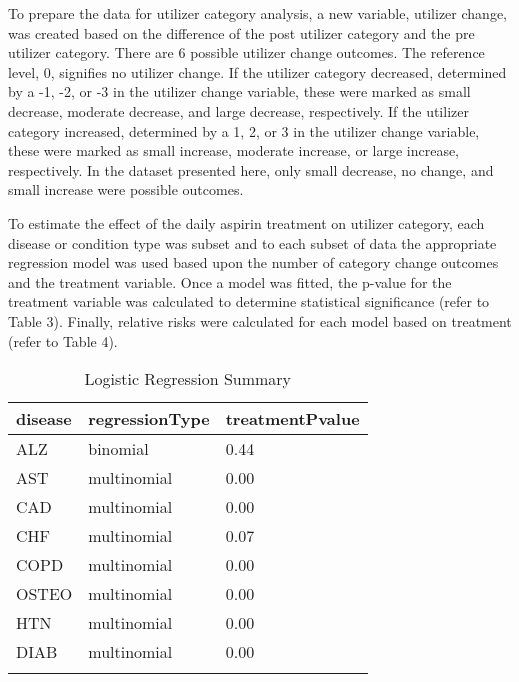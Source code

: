 \documentclass[
  english,
  man]{apa6}
\begin{document}
To prepare the data for utilizer category analysis, a new variable, utilizer change, was created based on the difference of the post utilizer category and the pre utilizer category. There are 6 possible utilizer change outcomes. The reference level, 0, signifies no utilizer change. If the utilizer category decreased, determined by a -1, -2, or -3 in the utilizer change variable, these were marked as small decrease, moderate decrease, and large decrease, respectively. If the utilizer category increased, determined by a 1, 2, or 3 in the utilizer change variable, these were marked as small increase, moderate increase, or large increase, respectively. In the dataset presented here, only small decrease, no change, and small increase were possible outcomes.

To estimate the effect of the daily aspirin treatment on utilizer category, each disease or condition type was subset and to each subset of data the appropriate regression model was used based upon the number of category change outcomes and the treatment variable. Once a model was fitted, the p-value for the treatment variable was calculated to determine statistical significance (refer to Table 3). Finally, relative risks were calculated for each model based on treatment (refer to Table 4).

\begin{table}[tbp]

\begin{center}
\begin{threeparttable}

\caption{\label{tab:logTable}Logistic Regression Summary}

\begin{tabular}{lll}
\toprule{}
disease & \multicolumn{1}{c}{regressionType} & \multicolumn{1}{c}{treatmentPvalue}\\
\midrule{}
ALZ & binomial & 0.44\\
AST & multinomial & 0.00\\
CAD & multinomial & 0.00\\
CHF & multinomial & 0.07\\
COPD & multinomial & 0.00\\
OSTEO & multinomial & 0.00\\
HTN & multinomial & 0.00\\
DIAB & multinomial & 0.00\\
\bottomrule{}
\end{tabular}

\end{threeparttable}
\end{center}

\end{table}
\end{document}
